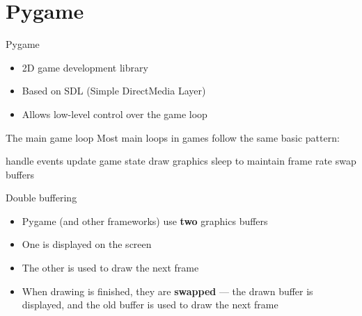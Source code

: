 \part{Pygame}
\frame{\partpage}

\begin{frame}{Pygame}
    \begin{itemize}
        \pause\item 2D game development library
        \pause\item Based on SDL (Simple DirectMedia Layer)
        \pause\item Allows low-level control over the game loop
    \end{itemize}
\end{frame}

\begin{frame}{The main game loop}
    \pause Most main loops in games follow the same basic pattern:
    \pause
    \begin{algorithmic}
        \Repeat
            \pause \State handle events
            \pause \State update game state
            \pause \State draw graphics
            \pause \State sleep to maintain frame rate
            \pause \State swap buffers
        \pause {}
    \end{algorithmic}
\end{frame}

\begin{frame}{Double buffering}
    \begin{itemize}
        \pause\item Pygame (and other frameworks) use \textbf{two} graphics buffers
        \pause\item One is displayed on the screen
        \pause\item The other is used to draw the next frame
        \pause\item When drawing is finished, they are \textbf{swapped} --- the drawn buffer is displayed, and the old buffer is used to draw the next frame
    \end{itemize}
\end{frame}

